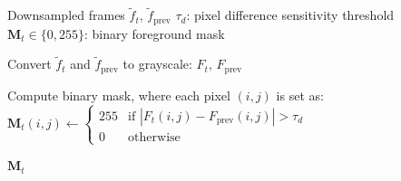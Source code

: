 \documentclass{article}
\begin{document}
\begin{preview}

    \setcounter{algorithm}{1} %

    \begin{algorithm}[H]
        \caption{Frame Difference Detector (FrameDiffDet)}
        \label{alg:framediff_det}
        \begin{algorithmic}[2]

            \Require Downsampled frames $\tilde{f}_t,\, \tilde{f}_{\text{prev}}$
            \Require $\tau_d$: pixel difference sensitivity threshold
            \Ensure $\mathbf{M}_t \in \{0, 255\}$: binary foreground mask

            \Statex

            \State Convert $\tilde{f}_t$ and
            $\tilde{f}_{\text{prev}}$ to grayscale:
            $F_t,\, F_{\text{prev}}$

            \Statex

            \State Compute binary mask, where each pixel $(i,j)$ is set as:
            \Statex \quad $\mathbf{M}_t(i,j) \leftarrow
            \begin{cases}
                255 & \text{if } |F_t(i,j) - F_{\text{prev}}(i,j)| > \tau_d \\
                0   & \text{otherwise}
            \end{cases}$

            \State \Return $\mathbf{M}_t$

        \end{algorithmic}
    \end{algorithm}

\end{preview}
\end{document}
